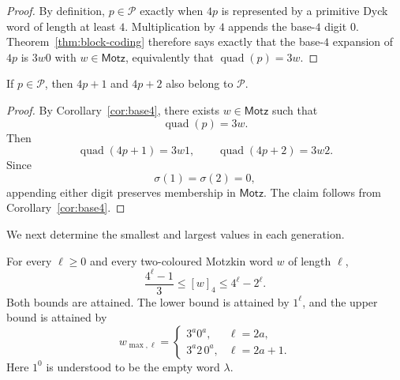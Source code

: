 \documentclass{ws-ijfcs}
\newcommand{\Pset}{\mathcal P}
\begin{document}
\begin{proof}
By definition, $p\in\Pset$ exactly when $4p$ is represented by a primitive
Dyck word of length at least $4$.  Multiplication by $4$ appends the
base-$4$ digit $0$.  Theorem~\ref{thm:block-coding} therefore says exactly
that the base-$4$ expansion of $4p$ is $3w0$ with
$w\in\mathsf{Motz}$, equivalently that
$\operatorname{quad}(p)=3w$.
\end{proof}
\begin{corollary}\label{cor:Pclosure}
If $p\in\Pset$, then $4p+1$ and $4p+2$ also belong to $\Pset$.
\end{corollary}

\begin{proof}
By Corollary~\ref{cor:base4}, there exists $w\in\mathsf{Motz}$ such that
\[
 \operatorname{quad}(p)=3w.
\]
Then
\[
 \operatorname{quad}(4p+1)=3w1,
 \qquad
 \operatorname{quad}(4p+2)=3w2.
\]
Since
\[
 \sigma(1)=\sigma(2)=0,
\]
appending either digit preserves membership in $\mathsf{Motz}$.  The claim follows from
Corollary~\ref{cor:base4}.
\end{proof}

We next determine the smallest and largest values in each generation.

\begin{lemma}\label{lem:extremal}
For every $\ell\geq0$ and every two-coloured Motzkin word $w$ of length $\ell$,
\begin{equation}\label{eq:motzkin-extrema}
  \frac{4^{\ell}-1}{3}\leq[w]_4\leq4^{\ell}-2^{\ell}.
\end{equation}
Both bounds are attained.  The lower bound is attained by $1^{\ell}$, and the
upper bound is attained by
\[
  w_{\max,\ell}=
  \begin{cases}
    3^a0^a,&\ell=2a,\\
    3^a2\,0^a,&\ell=2a+1.
  \end{cases}
\]
Here $1^0$ is understood to be the empty word $\lambda$.
\end{lemma}
\end{document}
